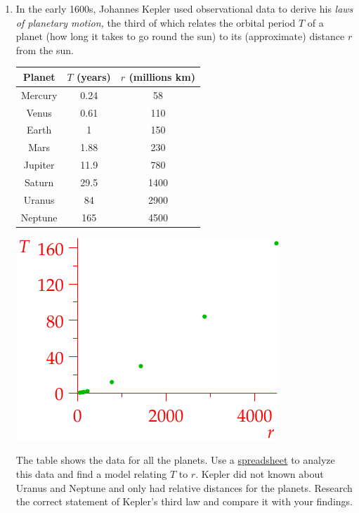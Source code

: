 \begin{exercises}{}{}
\begin{enumerate}
	  
	  \item In the early 1600s, Johannes Kepler used observational data to derive his \emph{laws of planetary motion,} the third of which relates the orbital period $T$ of a planet (how long it takes to go round the sun) to its (approximate) distance $r$ from the sun.
	
		\begin{minipage}[t]{0.59\linewidth}\vspace{0pt}
			\centering\begin{tabular}{c|c|c}
				Planet&$T$ (years)&$r$ (millions km)\\\hline\hline
				Mercury & 0.24 & 58\\
				Venus & 0.61 & 110\\
				Earth & 1 & 150\\
				Mars & 1.88 & 230\\
				Jupiter & 11.9 & 780\\
				Saturn & 29.5 & 1400\\
				Uranus & 84 & 2900\\
				Neptune & 165 & 4500
			\end{tabular}
		\end{minipage}
		\hfill
		\begin{minipage}[t]{0.4\linewidth}\vspace{0pt}
			\flushright\includegraphics{kepler}
		\end{minipage}\par
		The table shows the data for all the planets. Use a \href{http://math.uci.edu/~ndonalds/math8/kepler.xlsx}{spreadsheet} to analyze this data and find a model relating $T$ to $r$.\smallbreak
		Kepler did not known about Uranus and Neptune and only had relative distances for the planets. Research the correct statement of Kepler's third law and compare it with your findings.
	\end{enumerate}
\end{exercises}